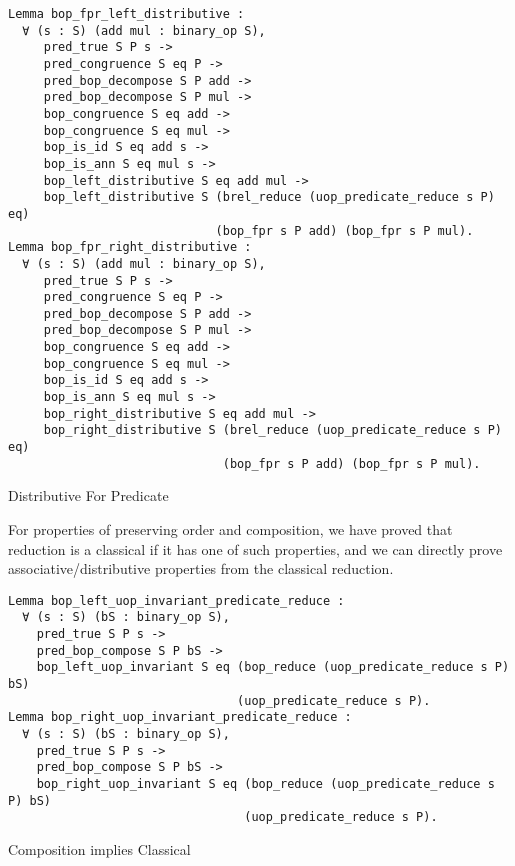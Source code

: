 \begin{listing}[H]
\begin{verbatim}
Lemma bop_fpr_left_distributive :
  ∀ (s : S) (add mul : binary_op S),
     pred_true S P s -> 
     pred_congruence S eq P ->
     pred_bop_decompose S P add ->
     pred_bop_decompose S P mul ->          
     bop_congruence S eq add ->     
     bop_congruence S eq mul -> 
     bop_is_id S eq add s ->     
     bop_is_ann S eq mul s ->
     bop_left_distributive S eq add mul ->
     bop_left_distributive S (brel_reduce (uop_predicate_reduce s P) eq) 
                             (bop_fpr s P add) (bop_fpr s P mul).
Lemma bop_fpr_right_distributive :
  ∀ (s : S) (add mul : binary_op S),
     pred_true S P s -> 
     pred_congruence S eq P ->
     pred_bop_decompose S P add ->
     pred_bop_decompose S P mul ->          
     bop_congruence S eq add ->     
     bop_congruence S eq mul -> 
     bop_is_id S eq add s ->     
     bop_is_ann S eq mul s ->
     bop_right_distributive S eq add mul ->
     bop_right_distributive S (brel_reduce (uop_predicate_reduce s P) eq) 
                              (bop_fpr s P add) (bop_fpr s P mul).
\end{verbatim}
\caption{Distributive For Predicate} 
\label{coq:proof:predicate_distributive}
\end{listing}
For properties of preserving order and composition, we have proved that reduction is a classical if it has one of such properties, and we can directly prove associative/distributive properties from the classical reduction.
\begin{listing}[H]
\begin{verbatim}
Lemma bop_left_uop_invariant_predicate_reduce :
  ∀ (s : S) (bS : binary_op S),
    pred_true S P s -> 
    pred_bop_compose S P bS ->
    bop_left_uop_invariant S eq (bop_reduce (uop_predicate_reduce s P) bS) 
                                (uop_predicate_reduce s P).
Lemma bop_right_uop_invariant_predicate_reduce :
  ∀ (s : S) (bS : binary_op S),
    pred_true S P s -> 
    pred_bop_compose S P bS ->    
    bop_right_uop_invariant S eq (bop_reduce (uop_predicate_reduce s P) bS) 
                                 (uop_predicate_reduce s P).
\end{verbatim}
\caption{Composition implies Classical} 
\label{coq:proof:composition_classic}
\end{listing}

